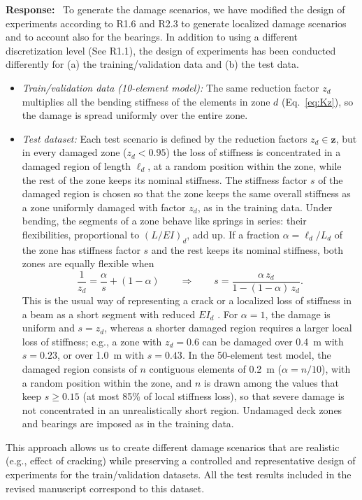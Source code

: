 \documentclass[11pt]{article}
\newenvironment{response}{\par\smallskip\noindent\color{resp}\textbf{Response:}\ }{\par}
\begin{document}
\begin{response}
To generate the damage scenarios, we have modified the design of experiments according to R1.6 and R2.3 to generate localized damage scenarios and to account also for the bearings. 
In addition to using a different discretization level (See R1.1), the design of experiments has been conducted differently for (a) the training/validation data and (b) the test data. 

\begin{itemize}[leftmargin=*]
	\item \emph{Train/validation data (10-element model):} The same reduction factor $z_d$ multiplies all the bending stiffness of the elements in zone $d$ (Eq.~\eqref{eq:Kz}), so the damage is spread uniformly over the entire zone. 
	
	\item \emph{Test dataset:} Each test scenario is defined by the reduction factors $z_d \in \mathbf{z}$, but in every damaged zone ($z_d<0.95$) the loss of stiffness is concentrated in a damaged region of length $\ell_d$, at a random position within the zone, while the rest of the zone keeps its nominal stiffness.
	The stiffness factor $s$ of the damaged region is chosen so that the zone keeps the same overall stiffness as a zone
	uniformly damaged with factor $z_d$, as in the training data. Under bending, the segments of a zone behave like springs
	in series: their flexibilities, proportional to $(L/EI)_{d}$, add up. If a fraction $\alpha=\ell_d/L_{d}$ of the zone has
	stiffness factor $s$ and the rest keeps its nominal stiffness, both zones are equally flexible when
	\begin{equation}
		\frac{1}{z_d}=\frac{\alpha}{s}+(1-\alpha)
		\qquad\Longrightarrow\qquad
		s=\frac{\alpha\,z_d}{1-(1-\alpha)\,z_d}.
		\label{eq:localized}
	\end{equation}
	This is the usual way of representing a crack or a localized loss of stiffness in a beam as a short segment with reduced $EI_d$ \citep[e.g.,][]{sinha2002simplified}. For 	$\alpha=1$, the damage is uniform and $s=z_d$, whereas a shorter damaged region requires a larger local loss of stiffness; e.g., a zone with $z_d=0.6$ can be damaged over 0.4~m with $s=0.23$, or over 1.0~m with $s=0.43$.
	In the 50-element test model, the damaged region consists of $n$ contiguous elements of 0.2~m ($\alpha=n/10$), with a random position within the zone, and $n$ is drawn among the values that keep $s\ge0.15$ (at most 85\% of local stiffness loss), so that severe damage is not concentrated in an unrealistically short region.
	Undamaged deck zones and bearings are imposed as in the training data.
\end{itemize}
This approach allows us to create different damage scenarios that are realistic (e.g., effect of cracking) while preserving a controlled and representative design of experiments for the train/validation datasets. 
All the test results included in the revised manuscript correspond to this dataset. 
\end{response}
\end{document}
